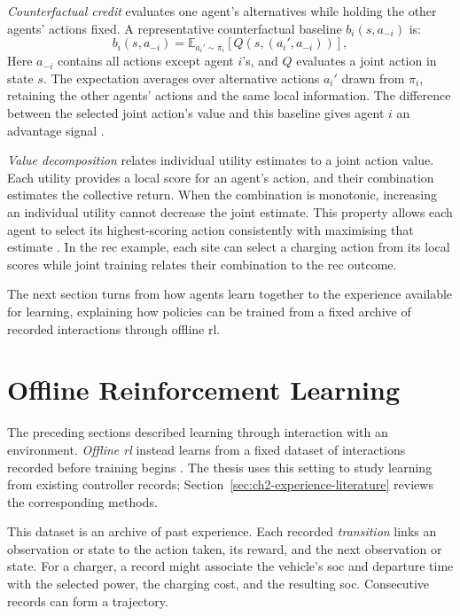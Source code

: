 \emph{Counterfactual credit} evaluates one agent's alternatives while holding the other agents' actions fixed. A representative counterfactual baseline $b_i(s,a_{-i})$ is:
\begin{equation}
b_i(s,a_{-i})=
\mathbb E_{a_i'\sim\pi_i}
\left[Q(s,(a_i',a_{-i}))\right],
\label{eq:ch2-counterfactual-baseline}
\end{equation}
Here $a_{-i}$ contains all actions except agent $i$'s, and $Q$ evaluates a joint action in state $s$. The expectation averages over alternative actions $a_i'$ drawn from $\pi_i$, retaining the other agents' actions and the same local information. The difference between the selected joint action's value and this baseline gives agent $i$ an advantage signal \parencite{foerster2018coma}.

\emph{Value decomposition} relates individual utility estimates to a joint action value. Each utility provides a local score for an agent's action, and their combination estimates the collective return. When the combination is monotonic, increasing an individual utility cannot decrease the joint estimate. This property allows each agent to select its highest-scoring action consistently with maximising that estimate \parencite{rashid2018qmix}. In the \gls{rec} example, each site can select a charging action from its local scores while joint training relates their combination to the \gls{rec} outcome.

The next section turns from how agents learn together to the experience available for learning, explaining how policies can be trained from a fixed archive of recorded interactions through offline \gls{rl}.

\FloatBarrier
\section{Offline Reinforcement Learning}
\label{sec:ch2-offline}

The preceding sections described learning through interaction with an environment. \emph{Offline \gls{rl}} instead learns from a fixed dataset of interactions recorded before training begins \parencite{levine2020offline}. The thesis uses this setting to study learning from existing controller records; Section~\ref{sec:ch2-experience-literature} reviews the corresponding methods.

This dataset is an archive of past experience. Each recorded \emph{transition} links an observation or state to the action taken, its reward, and the next observation or state. For a charger, a record might associate the vehicle's \gls{soc} and departure time with the selected power, the charging cost, and the resulting \gls{soc}. Consecutive records can form a trajectory.

